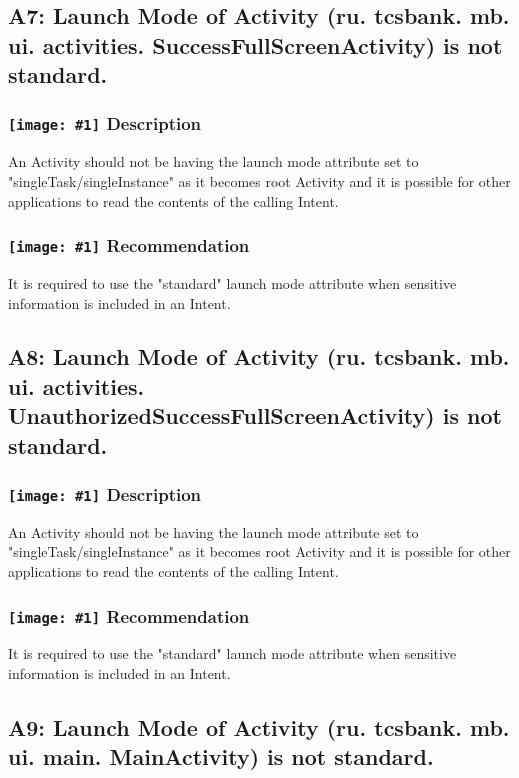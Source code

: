 \documentclass[12p]{article}
\newcommand{\icon}[1]{\texttt{[image: \#1]}}
\begin{document}
\subsection{A7: Launch Mode of Activity (ru. tcsbank. mb. ui. activities. SuccessFullScreenActivity) is not standard.}
\subsubsection*{\protect\icon{/home/miki/Documents/GITHUB/AndroidPermissions/python/vulns/report_icons/basic_sheet.png} Description}
An Activity should not be having the launch mode attribute set to "singleTask/singleInstance" as it becomes root Activity and it is possible for other applications to read the contents of the calling Intent.
\subsubsection*{\protect\icon{/home/miki/Documents/GITHUB/AndroidPermissions/python/vulns/report_icons/basic_todo.png} Recommendation}
It is required to use the "standard" launch mode attribute when sensitive information is included in an Intent.
\subsection{A8: Launch Mode of Activity (ru. tcsbank. mb. ui. activities. UnauthorizedSuccessFullScreenActivity) is not standard.}
\subsubsection*{\protect\icon{/home/miki/Documents/GITHUB/AndroidPermissions/python/vulns/report_icons/basic_sheet.png} Description}
An Activity should not be having the launch mode attribute set to "singleTask/singleInstance" as it becomes root Activity and it is possible for other applications to read the contents of the calling Intent.
\subsubsection*{\protect\icon{/home/miki/Documents/GITHUB/AndroidPermissions/python/vulns/report_icons/basic_todo.png} Recommendation}
It is required to use the "standard" launch mode attribute when sensitive information is included in an Intent.
\subsection{A9: Launch Mode of Activity (ru. tcsbank. mb. ui. main. MainActivity) is not standard.}
\end{document}

